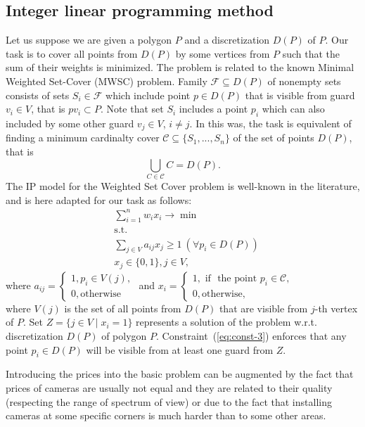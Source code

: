 \documentclass[runningheads,a4paper]{elsarticle}
\begin{document}
     \subsection{Integer linear programming method}
     Let us suppose we are given a polygon $P$ and a discretization $D(P)$ of $P$.  Our task is to cover all points from $D(P)$ by some vertices from $P$ such that the sum of their weights is minimized. 
     The problem is related to the known Minimal Weighted Set-Cover (MWSC) problem. 
     Family $\mathcal{F}\subseteq D(P)$ of nonempty sets consists of sets
      $S_i \in \mathcal{F}$ which include point $p \in D(P)$ that is visible from guard $v_i\in V$, that is $pv_i \subset P$.  Note that set $S_i$ includes a point $p_i$ which can also included by some other guard $v_j\in V$, $i \neq j$. In this was, the task is equivalent of  finding a minimum cardinalty cover $\mathcal{C}\subseteq\{S_1,...,S_n\}$ of the set of points $D(P)$, that is
     $$ \bigcup_{C \in \mathcal{C}} C = D(P).$$ The IP  model for the Weighted Set Cover problem is well-known in the literature, and is here adapted for our task as follows:
     \begin{align}
        &\sum_{i=1}^n w_ix_i \longrightarrow \min \\
        &\mbox{s.t.} \\
        &\sum_{j\in V} a_{ij}x_j \geq 1\ (\forall p_i\in D(P)) \label{eq:const-3}\\
        & x_j \in \{0,1\}, j \in V,
     \end{align}
     where
     $a_{ij} = \begin{cases}
          1, p_i \in V(j), \\
          0, \mbox{otherwise}
     \end{cases}$
     and $x_i = \begin{cases}
     	 1, \mbox{ if } \mbox{ the point } p_i \in \mathcal{C},\\
     	 0, \mbox{otherwise},
     \end{cases}$ \\
      where $V(j)$ is the set of all points from $D(P)$ that are visible from $j$-th vertex of $P$.
     Set $Z = \{j \in V\mid x_i=1\}$ represents a solution of the problem w.r.t. discretization $D(P)$ of polygon $P$.
     Constraint~(\ref{eq:const-3}) enforces that any point $p_i \in D(P)$ will be visible from at least one guard from $Z$.

    Introducing the prices into the basic problem can be augmented by the fact that prices of cameras are usually not equal and they are related to their quality (respecting the range of spectrum of view) or due to the fact that installing cameras at some specific corners is much harder than to some other areas. 
\end{document}
